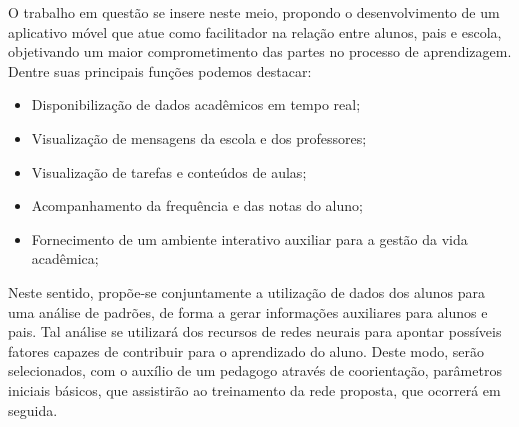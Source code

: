O trabalho em questão se insere neste meio, propondo o desenvolvimento de um aplicativo móvel que atue como facilitador na relação entre alunos, pais e escola, objetivando um maior comprometimento das partes no processo de aprendizagem. Dentre suas principais funções podemos destacar:
\begin{itemize}
	\item Disponibilização de dados acadêmicos em tempo real;
	\item Visualização de mensagens da escola e dos professores;
	\item Visualização de tarefas e conteúdos de aulas;
	\item Acompanhamento da frequência e das notas do aluno;
	\item Fornecimento de um ambiente interativo auxiliar para a gestão da vida acadêmica;
\end{itemize}

Neste sentido, propõe-se conjuntamente a utilização de dados dos alunos para uma análise de padrões, de forma a gerar informações auxiliares para alunos e pais. Tal análise se utilizará dos recursos de redes neurais para apontar possíveis fatores capazes de contribuir para o aprendizado do aluno. Deste modo, serão selecionados, com o auxílio de um pedagogo através de coorientação,  parâmetros iniciais básicos, que assistirão ao treinamento da rede proposta, que ocorrerá em seguida.